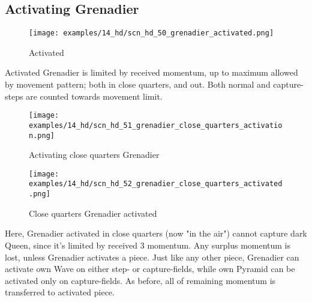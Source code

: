 \clearpage %

\subsection*{Activating Grenadier}
\label{sec:Hemera's Dawn/Grenadier/Activating Grenadier}

\vspace*{-0.7\baselineskip}
\noindent
\begin{wrapfigure}[7]{l}{0.4\textwidth}
\centering
\texttt{[image: examples/14\_hd/scn\_hd\_50\_grenadier\_activated.png]}
\vspace*{-0.5\baselineskip}
\caption{Activated}
\label{fig:scn_hd_50_grenadier_activated}
\end{wrapfigure}
Activated Grenadier is limited by received momentum, up to maximum allowed by movement
pattern; both in close quarters, and out. Both normal and capture-steps are counted
towards movement limit.


\vspace*{-0.7\baselineskip}
\noindent
\begin{figure}[!h]
\texttt{[image: examples/14\_hd/scn\_hd\_51\_grenadier\_close\_quarters\_activation.png]}
\vspace*{-1.4\baselineskip}
\caption{Activating close quarters Grenadier}
\label{fig:scn_hd_51_grenadier_close_quarters_activation}
\end{figure}

\vspace*{-1.2\baselineskip}
\noindent
\begin{figure}[!h]
\texttt{[image: examples/14\_hd/scn\_hd\_52\_grenadier\_close\_quarters\_activated.png]}
\vspace*{-1.4\baselineskip}
\caption{Close quarters Grenadier activated}
\label{fig:scn_hd_52_grenadier_close_quarters_activated}
\end{figure}

\vspace*{-0.5\baselineskip}
Here, Grenadier activated in close quarters (now "in the air") cannot capture dark
Queen, since it's limited by received 3 momentum.\newline
\indent
Any surplus momentum is lost, unless Grenadier activates a piece. Just like any
other piece, Grenadier can activate own Wave on either step- or capture-fields,
while own Pyramid can be activated only on capture-fields. As before, all of
remaining momentum is transferred to activated piece.

